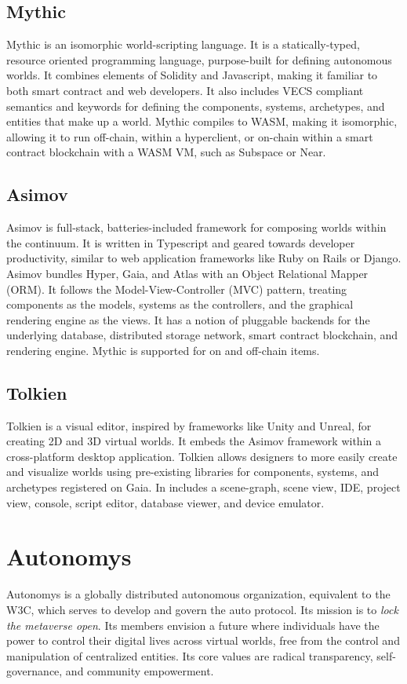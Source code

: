 \documentclass[twocolumn, 10pt]{article}
\begin{document}
\subsection{Mythic} 
Mythic is an isomorphic world-scripting language. It is a statically-typed, resource oriented programming language, purpose-built for defining autonomous worlds. It combines elements of Solidity and Javascript, making it familiar to both smart contract and web developers. It also includes VECS compliant semantics and keywords for defining the components, systems, archetypes, and entities that make up a world. Mythic compiles to WASM, making it isomorphic, allowing it to run off-chain, within a hyperclient, or on-chain within a smart contract blockchain with a WASM VM, such as Subspace or Near. 

\subsection{Asimov}
Asimov is full-stack, batteries-included framework for composing worlds within the continuum. It is written in Typescript and geared towards developer productivity, similar to web application frameworks like Ruby on Rails or Django. Asimov bundles Hyper, Gaia, and Atlas with an Object Relational Mapper (ORM). It follows the Model-View-Controller (MVC) pattern, treating components as the models, systems as the controllers, and the graphical rendering engine as the views. It has a notion of pluggable backends for the underlying database, distributed storage network, smart contract blockchain, and rendering engine. Mythic is supported for on and off-chain items.

\subsection{Tolkien}
Tolkien is a visual editor, inspired by frameworks like Unity and Unreal, for creating 2D and 3D virtual worlds. It embeds the Asimov framework within a cross-platform desktop application. Tolkien allows designers to more easily create and visualize worlds using pre-existing libraries for components, systems, and archetypes registered on Gaia. In includes a scene-graph, scene view, IDE, project view, console, script editor, database viewer, and device emulator.

\section{Autonomys}
Autonomys is a globally distributed autonomous organization, equivalent to the W3C, which serves to develop and govern the auto protocol. Its mission is to \textit{lock the metaverse open}. Its members envision a future where individuals have the power to control their digital lives across virtual worlds, free from the control and manipulation of centralized entities. Its core values are radical transparency, self-governance, and community empowerment. 
\end{document}
